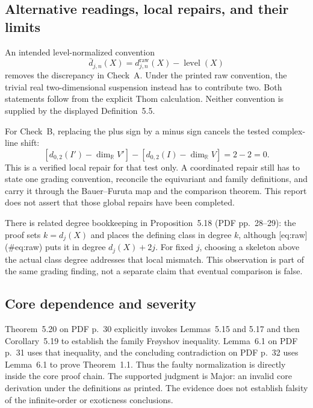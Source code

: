 \documentclass[10pt]{article}
\begin{document}
\subsection*{Alternative readings, local repairs, and their limits}
An intended level-normalized convention \[\bar d_{j,n}(X)=d^{\mathrm{raw}}_{j,n}(X)
                -\operatorname{level}(X)\] removes the discrepancy in Check A. Under the printed raw convention, the trivial real two-dimensional suspension instead has to contribute two. Both statements follow from the explicit Thom calculation. Neither convention is supplied by the displayed Definition 5.5.\par
For Check B, replacing the plus sign by a minus sign cancels the tested complex-line shift: \[[d_{0,2}(I')-\dim_{\mathbb R}V']-
 [d_{0,2}(I)-\dim_{\mathbb R}V]=2-2=0.\] This is a verified local repair for that test only. A coordinated repair still has to state one grading convention, reconcile the equivariant and family definitions, and carry it through the Bauer–Furuta map and the comparison theorem. This report does not assert that those global repairs have been completed.\par
There is related degree bookkeeping in Proposition 5.18 (PDF pp. 28–29): the proof sets \(k=d_j(X)\) and places the defining class in degree \(k\), although [eq:raw] (\#eq:raw) puts it in degree \(d_j(X)+2j\). For fixed \(j\), choosing a skeleton above the actual class degree addresses that local mismatch. This observation is part of the same grading finding, not a separate claim that eventual comparison is false.\par
\subsection*{Core dependence and severity}
Theorem 5.20 on PDF p. 30 explicitly invokes Lemmas 5.15 and 5.17 and then Corollary 5.19 to establish the family Frøyshov inequality. Lemma 6.1 on PDF p. 31 uses that inequality, and the concluding contradiction on PDF p. 32 uses Lemma 6.1 to prove Theorem 1.1. Thus the faulty normalization is directly inside the core proof chain. The supported judgment is Major: an invalid core derivation under the definitions as printed. The evidence does not establish falsity of the infinite-order or exoticness conclusions.\par
\end{document}
